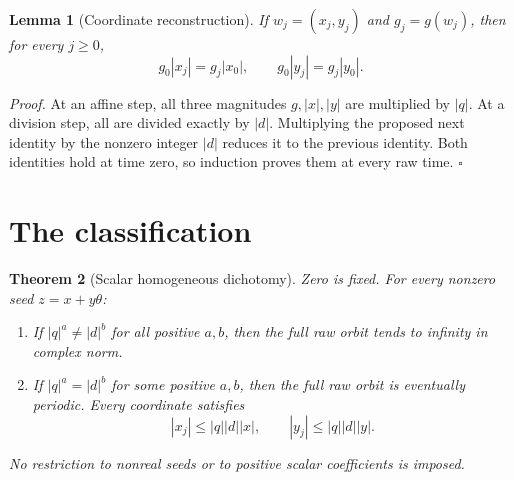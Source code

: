 \documentclass[11pt,letterpaper]{article}
\newtheorem{theorem}{Theorem}
\newtheorem{lemma}[theorem]{Lemma}
\newenvironment{proof}{\noindent\textit{Proof.}}{\hfill\(\square\)}
\begin{document}
\begin{lemma}[Coordinate reconstruction]
\label{lem:coordinates}
If \(w_j=(x_j,y_j)\) and \(g_j=g(w_j)\), then for every \(j\ge0\),
\[
g_0|x_j|=g_j|x_0|,\qquad g_0|y_j|=g_j|y_0|.
\]
\end{lemma}

\begin{proof}
At an affine step, all three magnitudes \(g,|x|,|y|\) are multiplied by \(|q|\).
At a division step, all are divided exactly by \(|d|\).
Multiplying the proposed next identity by the nonzero integer \(|d|\) reduces it to the previous identity.
Both identities hold at time zero, so induction proves them at every raw time.
\end{proof}

\section{The classification}

\begin{theorem}[Scalar homogeneous dichotomy]
\label{thm:dichotomy}
Zero is fixed. For every nonzero seed \(z=x+y\theta\):
\begin{enumerate}
\item If \(|q|^a\ne|d|^b\) for all positive \(a,b\), then the full raw orbit tends to infinity in complex norm.
\item If \(|q|^a=|d|^b\) for some positive \(a,b\), then the full raw orbit is eventually periodic. Every coordinate satisfies
\[
|x_j|\le |q||d||x|,\qquad |y_j|\le |q||d||y|.
\]
\end{enumerate}
No restriction to nonreal seeds or to positive scalar coefficients is imposed.
\end{theorem}
\end{document}
